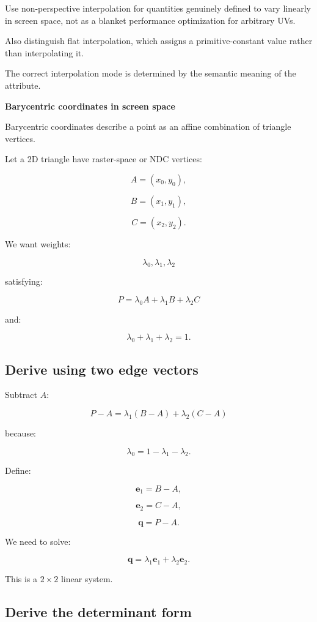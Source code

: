 Use non-perspective interpolation for quantities genuinely defined to vary linearly in screen space, not as a blanket performance optimization for arbitrary UVs.

Also distinguish flat interpolation, which assigns a primitive-constant value rather than interpolating it.

The correct interpolation mode is determined by the semantic meaning of the attribute.

\textbf{Barycentric coordinates in screen space}

Barycentric coordinates describe a point as an affine combination of triangle vertices.

Let a 2D triangle have raster-space or NDC vertices:

\[
 A=(x_0,y_0),
\]

\[
 B=(x_1,y_1),
\]

\[
 C=(x_2,y_2).
\]

We want weights:

\[
 \lambda_0,\lambda_1,\lambda_2
\]

satisfying:

\[
 \boxed{ P=\lambda_0A+\lambda_1B+\lambda_2C }
\]

and:

\[
 \boxed{ \lambda_0+\lambda_1+\lambda_2=1 }.
\]

\subsection{Derive using two edge vectors}\label{02-foundations-ii-ch034-derive-using-two-edge-vectors}

\hypertarget{02-foundations-ii-ch034-derive-using-two-edge-vectors}{}

Subtract \(A\):

\[
 P-A= \lambda_1(B-A)+\lambda_2(C-A)
\]

because:

\[
 \lambda_0=1-\lambda_1-\lambda_2.
\]

Define:

\[
 \mathbf e_1=B-A,
\]

\[
 \mathbf e_2=C-A,
\]

\[
 \mathbf q=P-A.
\]

We need to solve:

\[
 \mathbf q= \lambda_1\mathbf e_1+ \lambda_2\mathbf e_2.
\]

This is a \(2\times2\) linear system.

\subsection{Derive the determinant form}\label{02-foundations-ii-ch034-derive-the-determinant-form}

